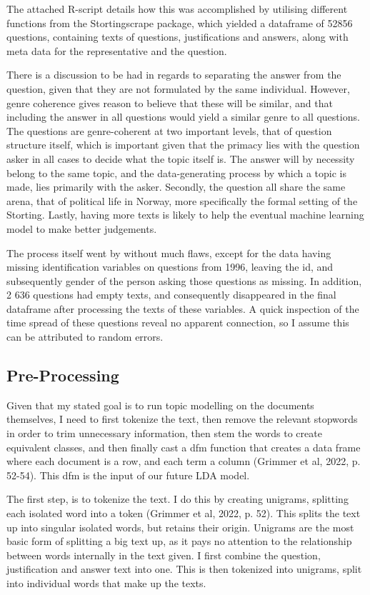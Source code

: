 \documentclass[12pt]{article}
\begin{document}
	The attached R-script details how this was accomplished by utilising different functions from the Stortingscrape package, which yielded a dataframe of 52856 questions, containing texts of questions, justifications and answers, along with meta data for the representative and the question. 
	
	There is a discussion to be had in regards to separating the answer from the question, given that they are not formulated by the same individual. However, genre coherence gives reason to believe that these will be similar, and that including the answer in all questions would yield a similar genre to all questions. The questions are genre-coherent at two important levels, that of question structure itself, which is important given that the primacy lies with the question asker in all cases to decide what the topic itself is. The answer will by necessity belong to the same topic, and the data-generating process by which a topic is made, lies primarily with the asker. Secondly, the question all share the same arena, that of political life in Norway, more specifically the formal setting of the Storting. Lastly, having more texts is likely to help the eventual machine learning model to make better judgements.
	
	The process itself went by without much flaws, except for the data having missing identification variables on questions from 1996, leaving the id, and subsequently gender of the person asking those questions as missing. In addition, 2 636 questions had empty texts, and consequently disappeared in the final dataframe after processing the texts of these variables. A quick inspection of the time spread of these questions reveal no apparent connection, so I assume this can be attributed to random errors.
	
	\subsection{Pre-Processing}
	
	Given that my stated goal is to run topic modelling on the documents themselves, I need to first tokenize the text, then remove the relevant stopwords in order to trim unnecessary information, then stem the words to create equivalent classes, and then finally cast a dfm function that creates a data frame where each document is a row, and each term a column (Grimmer et al, 2022, p. 52-54). This dfm is the input of our future LDA model. 
	
	The first step, is to tokenize the text. I do this by creating unigrams, splitting each isolated word into a token (Grimmer et al, 2022, p. 52). This splits the text up into singular isolated words, but retains their origin. Unigrams are the most basic form of splitting a big text up, as it pays no attention to the relationship between words internally in the text given. I first combine the question, justification and answer text into one. This is then tokenized into unigrams, split into individual words that make up the texts.
	
\end{document}
